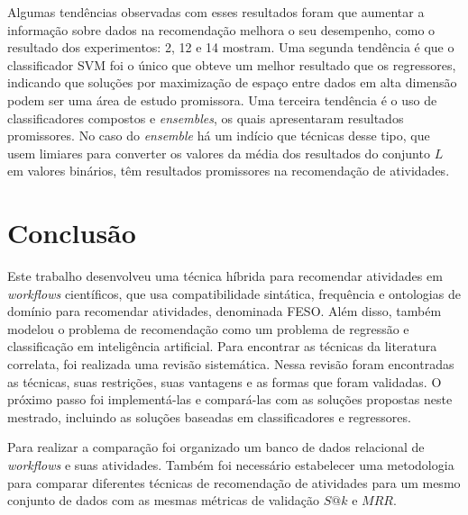\documentclass[10pt,letterpaper]{article}
\begin{document}
Algumas tendências observadas com esses resultados foram que aumentar a informação sobre dados na recomendação melhora o seu desempenho, como o resultado dos experimentos: 2, 12 e 14 mostram. Uma segunda tendência é que o classificador SVM foi o único que obteve um melhor resultado que os regressores, indicando que soluções por maximização de espaço entre dados em alta dimensão podem ser uma área de estudo promissora. Uma terceira tendência é o uso de classificadores compostos e \emph{ensembles}, os quais apresentaram resultados promissores. No caso do \emph{ensemble} há um indício que técnicas desse tipo, que usem limiares para converter os valores da média dos resultados do conjunto \(L\) em valores binários, têm resultados promissores na recomendação de atividades.







\section*{Conclusão}
Este trabalho desenvolveu uma técnica híbrida para recomendar atividades em \emph{workflows} científicos, que usa compatibilidade sintática, frequência e ontologias de domínio para recomendar atividades, denominada FESO. Além disso, também modelou o problema de recomendação como um problema de regressão e classificação em inteligência artificial.
Para encontrar as técnicas da literatura correlata, foi realizada uma revisão sistemática. Nessa revisão foram encontradas as técnicas, suas restrições, suas vantagens e as formas que foram validadas. O próximo passo foi implementá-las e compará-las com as soluções propostas neste mestrado, incluindo as soluções baseadas em classificadores e regressores. 

Para realizar a comparação foi organizado um banco de dados relacional de \emph{workflows} e suas atividades. Também foi necessário estabelecer uma metodologia para comparar diferentes técnicas de recomendação de atividades para um mesmo conjunto de dados com as mesmas métricas de validação \(S@k\) e \(MRR\). 
\end{document}
